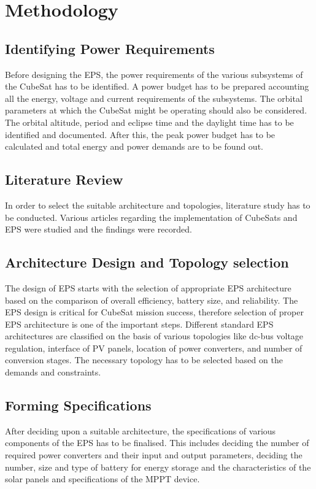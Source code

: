 \chapter{Methodology}
\justifying
\section{Identifying Power Requirements}
Before designing the EPS, the power requirements of the various subsystems of the CubeSat has to be identified. A power budget has to be prepared accounting all the energy, voltage and current requirements of the subsystems. The orbital parameters at which the CubeSat might be operating should also be considered. The orbital altitude, period and eclipse time and the daylight time has to be identified and documented. After this, the peak power budget has to be calculated and total energy and power demands are to be found out.
\section{Literature Review}
In order to select the suitable architecture and topologies, literature study has to be conducted. Various articles regarding the implementation of CubeSats and EPS were studied and the findings were recorded.
\section{Architecture Design and Topology selection}
The design of EPS starts with the selection of appropriate EPS architecture based on the comparison of overall efficiency, battery size, and reliability. The EPS design is critical for CubeSat mission success, therefore selection of proper EPS architecture is one of the important steps. Different standard EPS architectures are classified on the basis of various topologies like dc-bus voltage regulation, interface of PV panels, location of power converters, and number of conversion stages. The necessary topology has to be selected based on the demands and constraints.
\section{Forming Specifications}
After deciding upon a suitable architecture, the specifications of various components of the EPS has to be finalised. This includes deciding the number of required power converters and their input and output parameters, deciding the number, size and type of battery for energy storage and the characteristics of the solar panels and specifications of the MPPT device.
